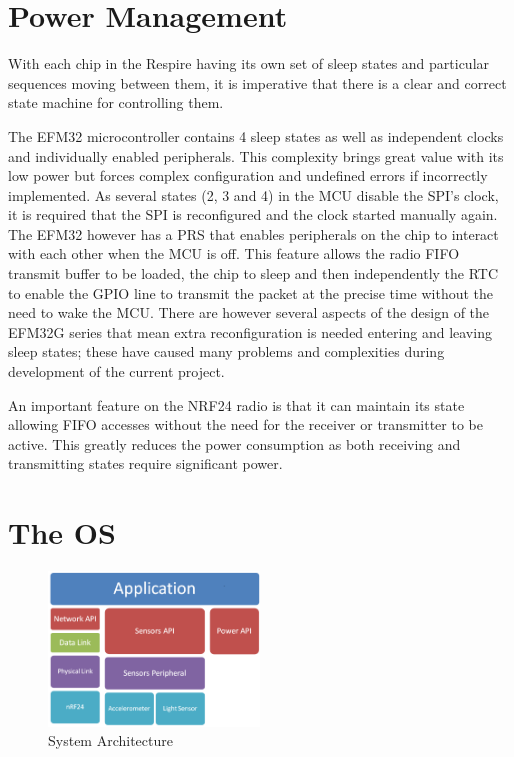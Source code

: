 \section{Power Management}
With each chip in the Respire having its own set of sleep states and particular sequences moving
between them, it is imperative that there is a clear and correct state machine for controlling them.


The EFM32 microcontroller contains 4 sleep states as well as independent clocks and individually
enabled peripherals. This complexity brings great value with its low power but forces complex
configuration and undefined errors if incorrectly implemented. As several states (2, 3 and 4) in the
\ac{MCU} disable the \ac{SPI}'s clock, it is required that the \ac{SPI} is reconfigured and the clock started
manually again. The EFM32 however has a \ac{PRS} that enables peripherals on
the chip to interact with each other when the \ac{MCU} is off. This feature allows the radio
\ac{FIFO} transmit buffer to be loaded, the chip to sleep and then independently the
\ac{RTC} to enable the \ac{GPIO} line to transmit the packet at the precise
time without the need to wake the \ac{MCU}. There are however several aspects of the design
of the EFM32G series\cite{EFM32Ref} that mean extra reconfiguration is needed entering
and leaving sleep states; these have caused many problems and complexities during
development of the current project.


An important feature on the \ac{NRF24} radio is that it can maintain its state allowing \ac{FIFO} accesses
without the need for the receiver or transmitter to be active. This greatly reduces the power
consumption as both receiving and transmitting states require significant power.


\section{The \acf{OS}}

\begin{figure}
  \vspace{-10pt}
  \begin{center}
    \includegraphics[width=0.5\textwidth, keepaspectratio=true]{images/archatechture.png}
  \end{center}
  \caption[System Architecture]{System Architecture}
  \vspace{-10pt}
\end{figure}

